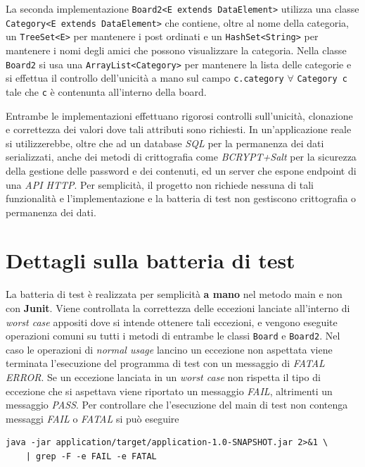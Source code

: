 \documentclass[12pt]{report}
\begin{document}
La seconda implementazione \verb|Board2<E extends DataElement>| utilizza una classe
\verb|Category<E extends DataElement>| che contiene, oltre al nome
della categoria, un \verb|TreeSet<E>| per mantenere i post ordinati e
un \verb|HashSet<String>| per mantenere i nomi degli amici che possono visualizzare la categoria.
Nella classe \verb|Board2| si usa una \verb|ArrayList<Category>| per mantenere la lista delle categorie e si effettua il
controllo dell'unicità a mano sul campo \verb|c.category| $\forall$ \verb|Category c| tale che \verb|c| è contenunta all'interno
della board.

Entrambe le implementazioni effettuano rigorosi controlli sull'unicità, clonazione e correttezza dei valori dove tali attributi sono richiesti.
In un'applicazione reale si utilizzerebbe, oltre che ad un database \textit{SQL} per la permanenza dei dati serializzati, anche dei
metodi di crittografia come \textit{BCRYPT+Salt} per la sicurezza della gestione delle password e dei contenuti, ed un server che espone endpoint di una \textit{API HTTP}.
Per semplicità, il progetto non richiede nessuna di tali funzionalità e l'implementazione e la batteria di test non gestiscono crittografia o permanenza dei dati.

\section{Dettagli sulla batteria di test}
La batteria di test è realizzata per semplicità \textbf{a mano} nel metodo main
e non con \textbf{Junit}. Viene controllata la correttezza delle eccezioni lanciate all'interno
di \textit{worst case} appositi dove si intende ottenere tali eccezioni, e vengono eseguite operazioni comuni
su tutti i metodi di entrambe le classi \verb|Board| e \verb|Board2|. Nel caso le operazioni
di \textit{normal usage} lancino un eccezione non aspettata viene terminata l'esecuzione del programma di test con un messaggio
di \textit{FATAL ERROR}. Se un eccezione lanciata in un \textit{worst case}
non rispetta il tipo di eccezione che si aspettava viene riportato un messaggio \textit{FAIL}, altrimenti un messaggio \textit{PASS}. Per controllare che l'esecuzione del main di test non contenga messaggi \textit{FAIL} o \textit{FATAL} si può eseguire

\begin{lstlisting}[style=bash]
java -jar application/target/application-1.0-SNAPSHOT.jar 2>&1 \
	| grep -F -e FAIL -e FATAL
\end{lstlisting}

\appendix

%
%
\end{document}
